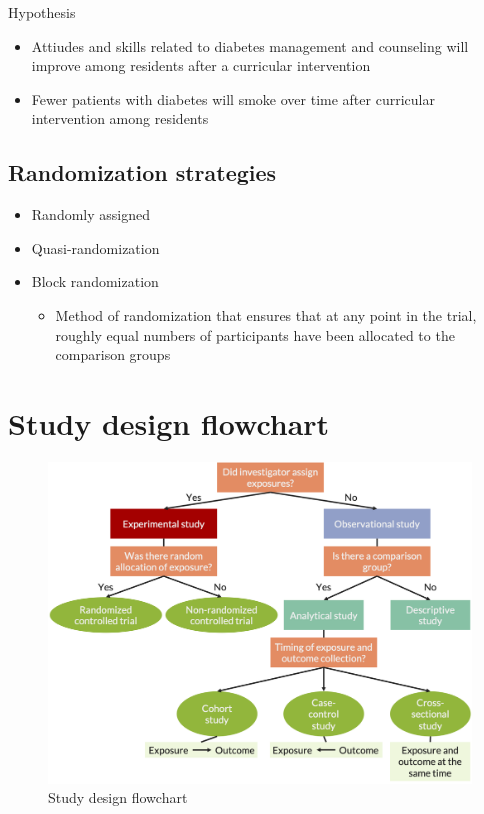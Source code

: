 \documentclass[
]{book}
\providecommand{\tightlist}{%
  \setlength{\itemsep}{0pt}\setlength{\parskip}{0pt}}
\begin{document}
Hypothesis

\begin{itemize}
\tightlist
\item
  Attiudes and skills related to diabetes management and counseling will improve among residents after a curricular intervention
\item
  Fewer patients with diabetes will smoke over time after curricular intervention among residents
\end{itemize}

\hypertarget{randomization-strategies}{%
\subsection{Randomization strategies}\label{randomization-strategies}}

\begin{itemize}
\tightlist
\item
  Randomly assigned
\item
  Quasi-randomization
\item
  Block randomization

  \begin{itemize}
  \tightlist
  \item
    Method of randomization that ensures that at any point in the trial, roughly equal numbers of participants have been allocated to the comparison groups
  \end{itemize}
\end{itemize}

\hypertarget{study-design-flowchart}{%
\section{Study design flowchart}\label{study-design-flowchart}}

\begin{figure}

{\centering \includegraphics[width=1\linewidth]{img/study_design/study_design_flowchart} 

}

\caption{Study design flowchart}\label{fig:unnamed-chunk-11}
\end{figure}
\end{document}
